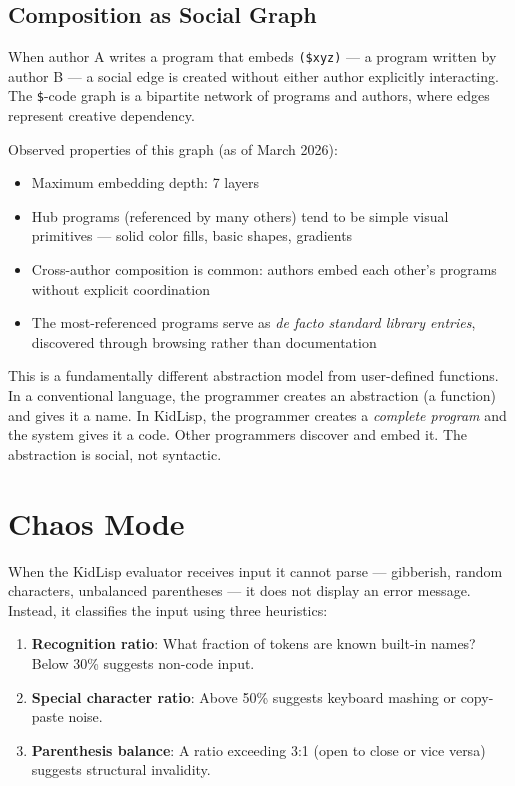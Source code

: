 \documentclass[sigconf,nonacm]{acmart}
\begin{document}
\subsection{Composition as Social Graph}

When author A writes a program that embeds \texttt{(\$xyz)} --- a program written by author B --- a social edge is created without either author explicitly interacting. The \texttt{\$}-code graph is a bipartite network of programs and authors, where edges represent creative dependency.

Observed properties of this graph (as of March 2026):
\begin{itemize}
  \item Maximum embedding depth: 7 layers
  \item Hub programs (referenced by many others) tend to be simple visual primitives --- solid color fills, basic shapes, gradients
  \item Cross-author composition is common: authors embed each other's programs without explicit coordination
  \item The most-referenced programs serve as \emph{de facto standard library entries}, discovered through browsing rather than documentation
\end{itemize}

This is a fundamentally different abstraction model from user-defined functions. In a conventional language, the programmer creates an abstraction (a function) and gives it a name. In KidLisp, the programmer creates a \emph{complete program} and the system gives it a code. Other programmers discover and embed it. The abstraction is social, not syntactic.

\section{Chaos Mode}
\label{sec:chaos}

When the KidLisp evaluator receives input it cannot parse --- gibberish, random characters, unbalanced parentheses --- it does not display an error message. Instead, it classifies the input using three heuristics:

\begin{enumerate}
  \item \textbf{Recognition ratio}: What fraction of tokens are known built-in names? Below 30\% suggests non-code input.
  \item \textbf{Special character ratio}: Above 50\% suggests keyboard mashing or copy-paste noise.
  \item \textbf{Parenthesis balance}: A ratio exceeding 3:1 (open to close or vice versa) suggests structural invalidity.
\end{enumerate}
\end{document}
